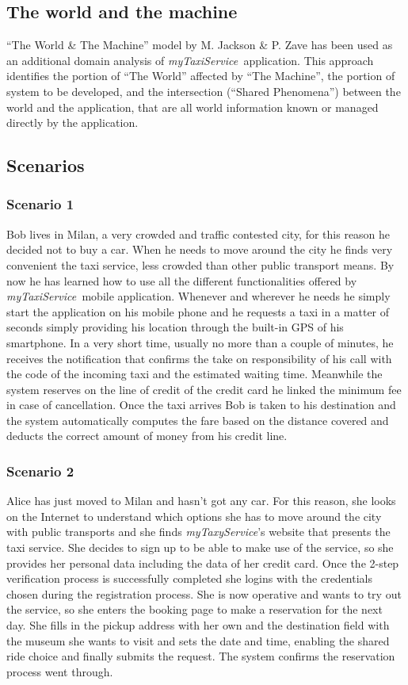 \documentclass[a4paper,11pt]{report} %
\newcommand{\mts}{\mbox{\normalfont\itshape myTaxiService\ }}
\begin{document}
	\subsection{The world and the machine} ``The World \& The Machine''	model by M. Jackson \& P. Zave has been used as an additional domain analysis of \mts application. This approach identifies the portion of ``The World'' affected by ``The Machine'', the portion of system to be developed, and the intersection (``Shared Phenomena'') between the world and the application, that are all world information known or
	managed directly by the application.
	
	\subsection{Scenarios}
	
	\subsubsection{Scenario 1} Bob lives in Milan, a very crowded and traffic contested city, for this reason he decided not to buy a car. When he needs to move around the city he finds very convenient the taxi service, less crowded than other public transport means. By now he has learned how to use all the different functionalities offered by \mts mobile application. Whenever and wherever he needs he simply start the application on his mobile phone and he requests a taxi in a matter of seconds simply providing his location through the built-in GPS of his smartphone. In a very short time, usually no more than a couple of minutes, he receives the notification that confirms the take on responsibility of his call with the code of the incoming taxi and the estimated waiting time. Meanwhile the system reserves on the line of credit of the credit card he linked the minimum fee in case of cancellation. Once the taxi arrives Bob is taken to his destination and the system automatically computes the fare based on the distance covered and deducts the correct amount of money from his credit line. 
	
	\subsubsection{Scenario 2} Alice has just moved to Milan and hasn’t got any car. For this reason, she looks on the Internet to understand which options she has to move around the city with public transports and she finds {\em myTaxyService}'s website that presents the taxi service. She decides to sign up to be able to make use of the service, so she provides her personal data including the data of her credit card. Once the 2-step verification process is successfully completed she logins with the credentials chosen during the registration process. She is now operative and wants to try out the service, so she enters the booking page to make a reservation for the next day. She fills in the pickup address with her own and the destination field with the museum she wants to visit and sets the date and time, enabling the shared ride choice and finally submits the request. The system confirms the reservation process went through. 
	
\end{document}
